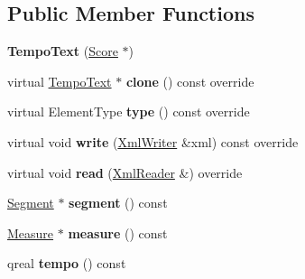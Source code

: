 \subsection*{Public Member Functions}
\begin{DoxyCompactItemize}
\item 
\mbox{\label{class_ms_1_1_tempo_text_a4b1a047e68531455890ccbeaee094ad7}} 
{\bfseries Tempo\+Text} (\hyperlink{class_ms_1_1_score}{Score} $\ast$)
\item 
\mbox{\label{class_ms_1_1_tempo_text_afa895dfa3d16e36a20bd48afd79d8054}} 
virtual \hyperlink{class_ms_1_1_tempo_text}{Tempo\+Text} $\ast$ {\bfseries clone} () const override
\item 
\mbox{\label{class_ms_1_1_tempo_text_ae1a2a34af300e50476bce7bb619b1bf5}} 
virtual Element\+Type {\bfseries type} () const override
\item 
\mbox{\label{class_ms_1_1_tempo_text_af8a4d1fe6b2ccd40f3498f98970b2087}} 
virtual void {\bfseries write} (\hyperlink{class_ms_1_1_xml_writer}{Xml\+Writer} \&xml) const override
\item 
\mbox{\label{class_ms_1_1_tempo_text_a58befe2d30fa04aca4e2ebe17daea59a}} 
virtual void {\bfseries read} (\hyperlink{class_ms_1_1_xml_reader}{Xml\+Reader} \&) override
\item 
\mbox{\label{class_ms_1_1_tempo_text_a5eca771202524e6e04ae32e8a4ecb890}} 
\hyperlink{class_ms_1_1_segment}{Segment} $\ast$ {\bfseries segment} () const
\item 
\mbox{\label{class_ms_1_1_tempo_text_a6f2bab83eba5b32f7de74e130a1d5326}} 
\hyperlink{class_ms_1_1_measure}{Measure} $\ast$ {\bfseries measure} () const
\item 
\mbox{\label{class_ms_1_1_tempo_text_ac270f98cf8e5ec561a6ebb3c0118dbf4}} 
qreal {\bfseries tempo} () const
\item 
\mbox{\label{class_ms_1_1_tempo_text_affd6aa32d2cce659a247e27677e5d503}} 

\end{DoxyCompactItemize}

